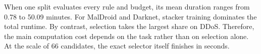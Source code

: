 When one split evaluates every rule and budget, its mean duration ranges
from 0.78 to 50.09 minutes. For MalDroid and Darknet, stacker training
dominates the total runtime. By contrast, selection takes the largest share on
DDoS.
Therefore, the main computation cost depends on the task rather than on
selection alone. At the scale of 66 candidates, the exact selector itself
finishes in seconds.
